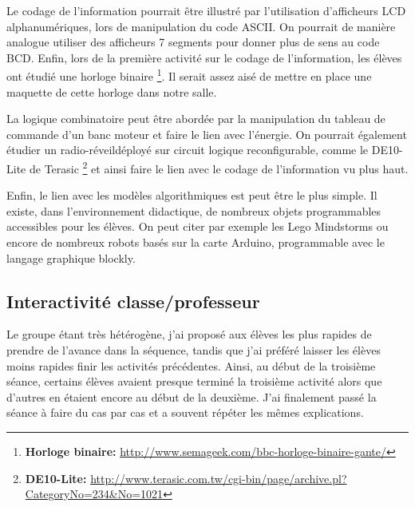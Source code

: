 \documentclass[pdftex,a4paper,12pt]{article}
\begin{document}
	Le codage de l'information pourrait être illustré par l'utilisation d'afficheurs LCD alphanumériques, lors de manipulation du code ASCII.
	On pourrait de manière analogue utiliser des afficheurs 7 segments pour donner plus de sens au code BCD.
	Enfin, lors de la première activité sur le codage de l'information, les élèves ont étudié une horloge binaire 
	\footnote{\textbf{Horloge binaire:} \url{http://www.semageek.com/bbc-horloge-binaire-gante/}}.
	Il serait assez aisé de mettre en place une maquette de cette horloge dans notre salle.

	La logique combinatoire peut être abordée par la manipulation du tableau de commande d'un banc moteur et faire le lien avec l'énergie.
	On pourrait également étudier un \og{}radio-réveil\fg{}déployé sur circuit logique reconfigurable, comme le DE10-Lite de Terasic 
	\footnote{\textbf{DE10-Lite:} \url{http://www.terasic.com.tw/cgi-bin/page/archive.pl?CategoryNo=234&No=1021}}
	et ainsi faire le lien avec le codage de l'information vu plus haut.

	Enfin, le lien avec les modèles algorithmiques est peut être le plus simple. 
	Il existe, dans l'environnement didactique, de nombreux objets programmables accessibles pour les élèves.
	On peut citer par exemple les Lego Mindstorms ou encore de nombreux robots basés sur la carte Arduino, programmable avec le langage graphique blockly.

	\subsection{Interactivité classe/professeur}
	Le groupe étant très hétérogène, j'ai proposé aux élèves les plus rapides de prendre de l'avance dans la séquence, 
	tandis que j'ai préféré laisser les élèves moins rapides finir les activités précédentes.
	Ainsi, au début de la troisième séance, certains élèves avaient presque terminé la troisième activité alors que d'autres en étaient encore au début de la deuxième.
	J'ai finalement passé la séance à faire du cas par cas et a souvent répéter les mêmes explications.
\end{document}
